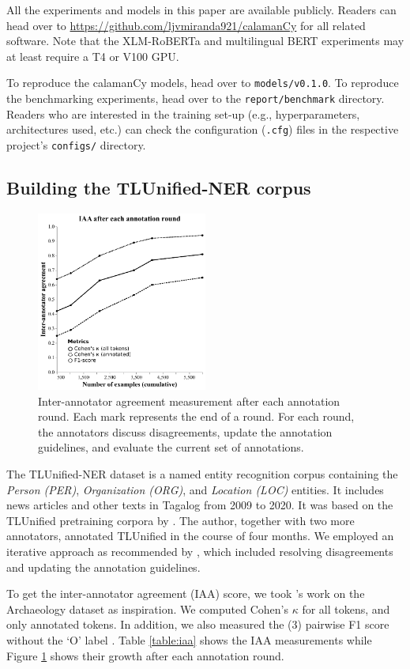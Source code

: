 \documentclass[11pt]{article}
\begin{document}
All the experiments and models in this paper are available publicly. 
Readers can head over to \url{https://github.com/ljvmiranda921/calamanCy} for all related software.
Note that the XLM-RoBERTa and multilingual BERT experiments may at least require a T4 or V100 GPU.

To reproduce the calamanCy models, head over to \texttt{models/v0.1.0}.
To reproduce the benchmarking experiments, head over to the \texttt{report/benchmark} directory.
Readers who are interested in the training set-up (e.g., hyperparameters, architectures used, etc.) can check the configuration (\texttt{.cfg}) files in the respective project's \texttt{configs/} directory.

\subsection{Building the TLUnified-NER corpus}


\begin{figure}[t]
\centering
\includegraphics[width=0.5\textwidth]{images/iaa}
\caption{
  Inter-annotator agreement measurement after each annotation round.
  Each mark represents the end of a round. 
  For each round, the annotators discuss disagreements, update the annotation guidelines, and evaluate the current set of annotations.
}
\label{fig:iaa}
\end{figure}

The TLUnified-NER dataset is a named entity recognition corpus containing the \textit{Person (PER)}, \textit{Organization (ORG)}, and \textit{Location  (LOC)} entities.
It includes news articles and other texts in Tagalog from 2009 to 2020.
It was based on the TLUnified pretraining corpora by \cite{Cruz2021ImprovingLL}.
The author, together with two more annotators, annotated TLUnified in the course of four months.
We employed an iterative approach as recommended by \citet{Reiter2017HT}, which included resolving disagreements and updating the annotation guidelines.

To get the inter-annotator agreement (IAA) score, we took \citet{Brandsen2020CreatingAD}'s work on the Archaeology dataset as inspiration.
We computed Cohen's $\kappa$ for all tokens, and only annotated tokens.  
In addition, we also measured the (3) pairwise F1 score without the `O' label \citep{Deleger2012BG}.
Table \ref{table:iaa} shows the IAA measurements while Figure \ref{fig:iaa} shows their growth after each annotation round.


\end{document}
